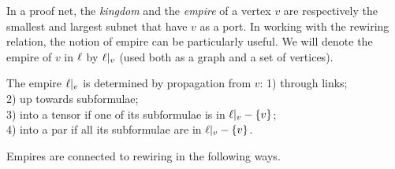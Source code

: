 \documentclass{sigplanconf-modified}
\begin{document}
%
%
%
%



In a proof net, the \emph{kingdom} and the \emph{empire} of a vertex $v$ are respectively the smallest and largest subnet that have $v$ as a port.
%
In working with the rewiring relation, the notion of empire can be particularly useful.
%
\color{red} 
We will denote the empire of $v$ in $\ell$ by $\emp v$ (used both as a graph and a set of vertices).
\color{black}


\begin{proposition}
\label{prop:empire propagation}
The empire $\emp v$ is determined by propagation from $v$: 1) through links;\\ \color{red} 2) up towards subformulae;\\ 3) into a tensor if one of its subformulae is in $\emp v-\{v\}$;\\ 4) into a par if all its subformulae are in $\emp v-\{v\}$.%
\end{proposition}


Empires are connected to rewiring in the following ways.
\end{document}
